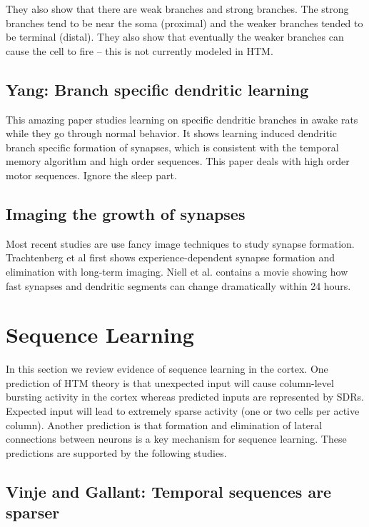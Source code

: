\documentclass{article} %
\begin{document}
They also show that there are weak branches and strong branches.  The strong
branches tend to be near the soma (proximal) and the weaker branches tended to
be terminal (distal). They also show that eventually the weaker branches can
cause the cell to fire – this is not currently modeled in HTM.


\subsection{Yang: Branch specific dendritic learning}

This amazing paper \cite{Yang2014} studies learning on specific dendritic
branches in awake rats while they go through normal behavior. It shows learning
induced dendritic branch specific formation of synapses, which is consistent
with the temporal memory algorithm and high order sequences. This paper deals
with high order motor sequences. Ignore the sleep part.


\subsection{Imaging the growth of synapses}

Most recent studies are use fancy image techniques to study synapse formation.
Trachtenberg et al \cite{Trachtenberg2002} first shows experience-dependent
synapse formation and elimination with long-term imaging. Niell et al.
\cite{Niell2004} contains a movie showing how fast synapses and dendritic
segments can change dramatically within 24 hours.

\section{Sequence Learning}

In this section we review evidence of sequence learning in the cortex. One
prediction of HTM theory is that unexpected input will cause  column-level
bursting  activity in the cortex whereas predicted inputs are represented by
SDRs. Expected input will lead to extremely sparse activity (one or two cells
per active column). Another prediction is that formation and elimination of
lateral connections between neurons is a key mechanism for sequence
learning. These predictions are supported by the following studies.

\subsection{Vinje and Gallant: Temporal sequences are sparser}
\end{document}
